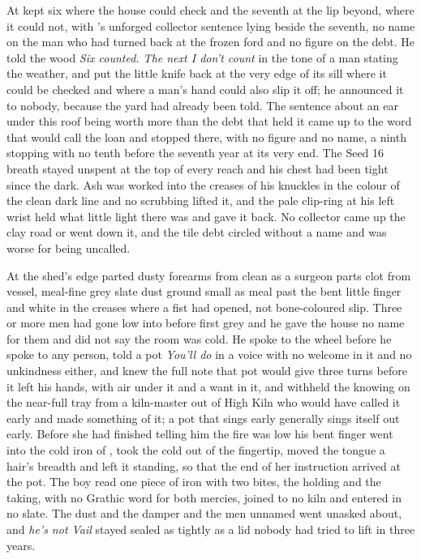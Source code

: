 \scenebreak

At   kept six where the house could check and the seventh at the lip beyond, where it could not, with 's unforged collector sentence lying beside the seventh, no name on the man who had turned back at the frozen ford and no figure on the debt. He told the wood \emph{Six counted. The next I don't count} in the tone of a man stating the weather, and put the little knife back at the very edge of its sill where it could be checked and where a man's hand could also slip it off; he announced it to nobody, because the yard had already been told. The sentence about an ear under this roof being worth more than the debt that held it came up to the word that would call the loan and stopped there, with no figure and no name, a ninth stopping with no tenth before the seventh year at its very end. The Seed 16 breath stayed unspent at the top of every reach and his chest had been tight since the dark. Ash was worked into the creases of his knuckles in the colour of the clean dark line and no scrubbing lifted it, and the pale clip-ring at his left wrist held what little light there was and gave it back. No collector came up the clay road or went down it, and the tile debt circled without a name and was worse for being uncalled.

At the shed's edge  parted dusty forearms from clean as a surgeon parts clot from vessel, meal-fine grey slate dust ground small as meal past the bent little finger and white in the creases where a fist had opened, not bone-coloured slip. Three or more men had gone low into  before first grey and he gave the house no name for them and did not say the room was cold. He spoke to the wheel before he spoke to any person, told a pot \emph{You'll do} in a voice with no welcome in it and no unkindness either, and knew the full note that pot would give three turns before it left his hands, with air under it and a want in it, and withheld the knowing on the near-full tray from a kiln-master out of High Kiln who would have called it early and made something of it; a pot that sings early generally sings itself out early. Before she had finished telling him the fire was low his bent finger went into the cold iron of , took the cold out of the fingertip, moved the tongue a hair's breadth and left it standing, so that the end of her instruction arrived at the pot. The boy read one piece of iron with two bites, the holding and the taking, with no Grathic word for both mercies, joined to no kiln and entered in no slate. The dust and the damper and the men unnamed went unasked about, and \emph{he's not Vail} stayed sealed as tightly as a lid nobody had tried to lift in three years.

